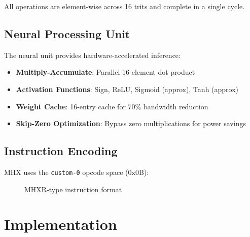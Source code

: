 \documentclass[conference,10pt]{IEEEtran}
\newcommand{\mhx}{\textsc{MHX\texttrademark}}
\begin{document}
All operations are element-wise across 16 trits and complete in a single cycle.

\subsection{Neural Processing Unit}

The neural unit provides hardware-accelerated inference:

\begin{itemize}
    \item \textbf{Multiply-Accumulate}: Parallel 16-element dot product
    \item \textbf{Activation Functions}: Sign, ReLU, Sigmoid (approx), Tanh (approx)
    \item \textbf{Weight Cache}: 16-entry cache for 70\% bandwidth reduction
    \item \textbf{Skip-Zero Optimization}: Bypass zero multiplications for power savings
\end{itemize}

\subsection{Instruction Encoding}

\mhx{} uses the \texttt{custom-0} opcode space (0x0B):

\begin{figure}[h]
\centering
{}
\caption{MHX\texttrademark R-type instruction format}
\label{fig:encoding}
\end{figure}

\section{Implementation}
\label{sec:implementation}
\end{document}
